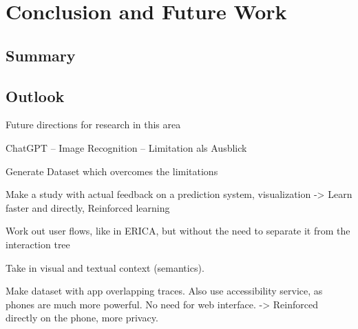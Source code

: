 \chapter{Conclusion and Future Work}
\label{sec:zusfas}

\section*{Summary}
\section*{Outlook}

Future directions for research in this area

ChatGPT – Image Recognition – Limitation als Ausblick

Generate Dataset which overcomes the limitations

Make a study with actual feedback on a prediction system, visualization
-> Learn faster and directly, Reinforced learning

Work out user flows, like in ERICA, but without the need to separate it from the interaction tree

Take in visual and textual context (semantics).

Make dataset with app overlapping traces.
Also use accessibility service, as phones are much more powerful.
No need for web interface.
-> Reinforced directly on the phone, more privacy.

